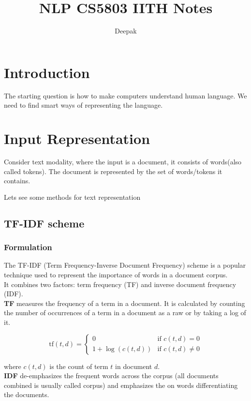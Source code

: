 \documentclass[12pt]{article}
\title{NLP CS5803 IITH Notes}
\author{Deepak}
\newcommand{\bold}[1]{\textbf{#1}}
\begin{document}
\maketitle
\tableofcontents

\newpage

\section{Introduction}
The starting question is how to make computers understand human
language. We need to find smart ways of representing the language.

\section{Input Representation}
    Consider text modality, where the input is a document, it
    consists of words(also called tokens). The document is represented
    by the set of words/tokens it contains.

    Lets see some methods for text representation
    

    \subsection{TF-IDF scheme}

        \subsubsection{Formulation}
            The TF-IDF (Term Frequency-Inverse Document Frequency) scheme is a
            popular technique used to represent the importance of words in a 
            document corpus. \\
            It combines two factors: term frequency (TF) and inverse document frequency (IDF). \\
            \bold{TF} measures the frequency of a term in a document. 
            It is calculated by counting the number of occurrences of a term 
            in a document as a raw or by taking a log of it.

            \[
            \text{tf}(t, d) = \begin{cases}
                            0 & \text{if } c(t, d) = 0 \\
                            1 + \log(c(t, d)) & \text{if } c(t, d) \neq 0
                        \end{cases}
            \]

            where $c(t, d)$ is the count of term $t$ in document $d$.
            \\
            \bold{IDF} de-emphasizes the frequent words across the corpus
            (all documents combined is usually called corpus) and emphasizes
            the on words differentiating the documents.
\end{document}
